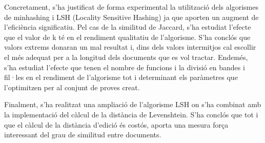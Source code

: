 \documentclass[catalan, 12pt]{report}
\begin{document}
Concretament, s'ha justificat de forma experimental la utilització dels algorismes de minhashing i LSH (Locality Sensitive Hashing) ja que aporten un augment de l'eficiència significatiu. Pel cas de la similitud de Jaccard, s'ha estudiat l'efecte que el valor de k té en el rendiment qualitatiu de l'algorisme. S'ha conclós que valors extrems donaran un mal resultat i, dins dels valors intermitjos cal escollir el més adequat per a la longitud dels documents que es vol tractar. Endemés, s'ha estudiat l'efecte que tenen el nombre de funcions i la divisió en bandes i fil·les en el rendiment de l'algorisme tot i determinant els paràmetres que l'optimitzen per al conjunt de proves creat. \newline

Finalment, s'ha realitzat una ampliació de l'algorisme LSH on s'ha combinat amb la implementació del càlcul de la distància de Levenshtein. S'ha conclós que tot i que el  càlcul de la distància d'edició és costós, aporta una mesura força interessant del grau de similitud entre documents.
\end{document}
